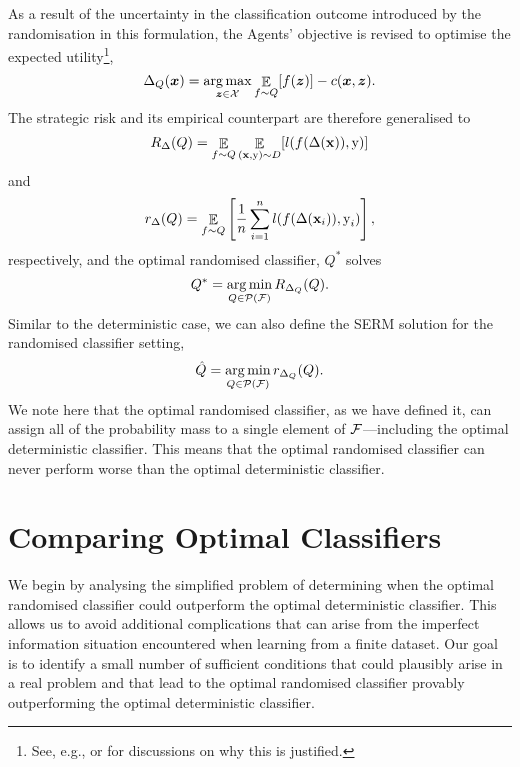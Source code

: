As a result of the uncertainty in the classification outcome introduced by the randomisation in this formulation, the Agents' objective is revised to optimise the expected utility\footnote{See, e.g., \citet{berger2013} or \citet{maschler2020} for discussions on why this is justified.},
\begin{equation}
    \Delta_Q({\bm{x}}) = \operatorname*{arg\,max}_{{\bm{z}} \in {\mathcal{X}}} \mathop{\mathbb{E}}_{f \sim Q}[f({\bm{z}})] - c({\bm{x}}, {\bm{z}}).
\end{equation}
The strategic risk and its empirical counterpart are therefore generalised to
\begin{equation}
    R_\Delta(Q) = \mathop{\mathbb{E}}_{f \sim Q} \mathop{\mathbb{E}}_{({\mathbf{x}}, {\textnormal{y}}) \sim D}[l(f(\Delta({\mathbf{x}})), {\textnormal{y}})]
    \label{eqn:randomised_strategic_risk}
\end{equation}
and
\begin{equation}
    r_\Delta(Q) = \mathop{\mathbb{E}}_{f \sim Q} \left[ \frac{1}{n} \sum_{i=1}^n l(f(\Delta({\mathbf{x}}_i)), {\textnormal{y}}_i) \right],
\end{equation}
respectively, and the optimal randomised classifier, $Q^{\ast}$ solves
\begin{equation}
    Q^{\ast} = \operatorname*{arg\,min}_{Q \in {\mathcal{P}}({\mathcal{F}})} R_{\Delta_{Q}}(Q).
\end{equation}
Similar to the deterministic case, we can also define the SERM solution for the randomised classifier setting,
\begin{equation}
    \hat{Q} = \operatorname*{arg\,min}_{Q \in {\mathcal{P}}({\mathcal{F}})} r_{\Delta_Q}(Q).
\end{equation}
We note here that the optimal randomised classifier, as we have defined it, can assign all of the probability mass to a single element of ${\mathcal{F}}$---including the optimal deterministic classifier. This means that the optimal randomised classifier can never perform worse than the optimal deterministic classifier.

\section{Comparing Optimal Classifiers}
\label{sec:comparing_optimal_classifiers}
We begin by analysing the simplified problem of determining when the optimal randomised classifier could outperform the optimal deterministic classifier. This allows us to avoid additional complications that can arise from the imperfect information situation encountered when learning from a finite dataset. Our goal is to identify a small number of sufficient conditions that could plausibly arise in a real problem and that lead to the optimal randomised classifier provably outperforming the optimal deterministic classifier. 

